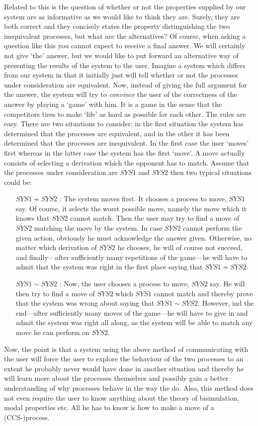 Related to this is the question of whether or not the properties supplied by our system are as informative as we would like to think they are. Surely, they are both correct and they concisely states the property distinguishing the two inequivalent processes, but what are the alternatives? Of course, when asking a question like this you cannot expect to receive a final answer. We will certainly not give `the' answer, but we would like to put forward an alternative way of presenting the results of the system to the user. Imagine a system which differs from our system in that it initially just will tell whether or not the processes under consideration are equivalent. Now, instead of giving the full argument for the answer, the system will try to {\em convince\/} the user of the correctness of the answer by playing a `game' with him. It is a game in the sense that the competitors tires to make `life' as hard as possible for each other. The rules are easy. There are two situations to consider; in the first situation the system has determined that the processes are equivalent, and in the other it has been determined that the processes are inequivalent. In the first case the user `moves' first whereas in the latter case the system has the first `move'. A move actually consists of selecting a derivation which the opponent has to match. Assume that the processes under consideration are $SYS1$ and $SYS2$ then two typical situations could be:
\begin{itemize}
\item[$SYS1\not\sim SYS2$ :] The system moves first. It chooses a process to move, $SYS1$ say. Of course, it selects the worst possible move, namely the move which it knows that $SYS2$ cannot match. Then the user may try to find a move of $SYS2$ matching the move by the system. In case $SYS2$ cannot perform the given action, obviously he must acknowledge the answer given. Otherwise, no matter which derivation of $SYS2$ he chooses, he will of course not succeed, and finally---after sufficiently many repetitions of the game---he will have to admit that the system was right in the first place saying that $SYS1\not\sim SYS2$.

\item[$SYS1\sim SYS2$ :] Now, the user chooses a process to move, $SYS2$ say. He will then try to find a move of $SYS2$ which $SYS1$ cannot match and thereby prove that the system was wrong about saying that $SYS1\sim SYS2$. However, ind the end---after sufficiently many moves of the game---he will have to give in and admit the system was right all along, as the system will be able to match any move he can perform on $SYS2$.

\end{itemize}
Now, the point is that a system using the above method of communicating with the user will force the user to explore the behaviour of the two processes to an extent he probably never would have done in another situation and thereby he will learn more about the processes themselves and possibly gain a better understanding of why processes behave in the way the do. Also, this method does not even require the user to know anything about the theory of bisimulation, modal properties etc. All he has to know is how to make a move of a (CCS-)process.


